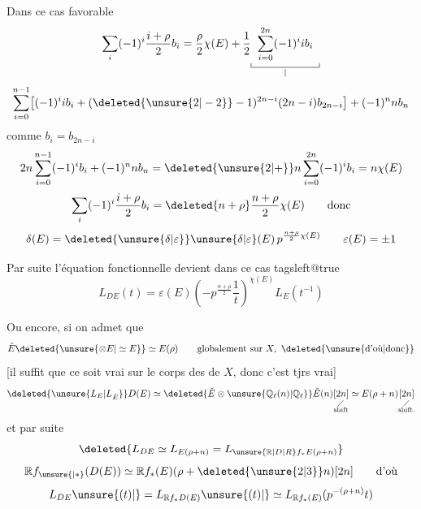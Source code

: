 
Dans ce cas favorable
\[
 \sum_i(-1)^i\frac{i+\rho}{2}b_i
 =\frac{\rho}{2}\chi(E)+\frac12
 \underset{\substack{\rule{0.4pt}{4pt}\rule{6em}{0.4pt}\rule{0.4pt}{4pt}\\ |}}
 {\sum_{i=0}^{2n}(-1)^i i b_i}
\]
\[
 \sum_{i=0}^{n-1}\bigl[(-1)^i i b_i+
 (\deleted{\unsure{2|-2}}-1)^{2n-i}(2n-i)b_{2n-i}\bigr]+(-1)^n n b_n
\]
comme $b_i=b_{2n-i}$
\[
 2n\sum_{i=0}^{n-1}(-1)^i b_i+(-1)^n n b_n
 =\deleted{\unsure{2|+}}n\sum_{i=0}^{2n}(-1)^i b_i=n\chi(E)
\]
\[
 \sum_i(-1)^i\frac{i+\rho}{2}b_i
 =\deleted{n+\rho}\frac{n+\rho}{2}\chi(E) \qquad \text{donc}
\]
\[
 \delta(E)=\deleted{\unsure{\delta|\varepsilon}}\unsure{\delta|\varepsilon}(E)\,
 p^{\frac{n+\rho}{2}\chi(E)}
 \qquad \varepsilon(E)=\pm1
\]

Par suite l'équation fonctionnelle devient dans ce cas
\begingroup\csname tagsleft@true\endcsname\[
 L_{DE}(t)=\varepsilon(E)\left(-p^{\frac{n+\rho}{2}}\frac{1}{t}\right)^{\chi(E)}
 L_E(t^{-1}) \tag*{(2)}
\]\endgroup

Ou encore, si on admet que
\[
 \check E\deleted{\unsure{\otimes E|\simeq E}}\simeq E(\rho)
 \qquad \text{globalement sur }X,\ \text{\deleted{\unsure{d'où|donc}}}
\]
[il suffit que ce soit vrai sur le corps des  de $X$, donc c'est  tjrs vrai]
\[
 \deleted{\unsure{L_E|L_{\check E}}}D(E)\simeq
 \deleted{\check E\otimes\unsure{\mathbb Q_\ell(n)|\mathbb Q_\ell}}
 \check E(n)\underset{\substack{\diagup\\\text{shift}}}{[2n]}
 \simeq E(\rho+n)\underset{\substack{\diagup\\\text{shift.}}}{[2n]}
\]
et par suite
\[
 \deleted{L_{DE}\simeq L_{E(\rho+n)}=
 L_{\unsure{\mathbb R|D|R}f_* E(\rho+n)}}
\]
\[
 \mathbb R f_{\unsure{{}|*}}(D(E))\simeq
 \mathbb R f_*(E)(\rho+\deleted{\unsure{2|3}}n)[2n]\qquad \text{d'où}
\]
\[
 L_{DE}\unsure{(t)|{}}=L_{\mathbb R f_*D(E)}\unsure{(t)|{}}
 \simeq L_{\mathbb R f_*(E)}(p^{-(\rho+n)}t)
\]

